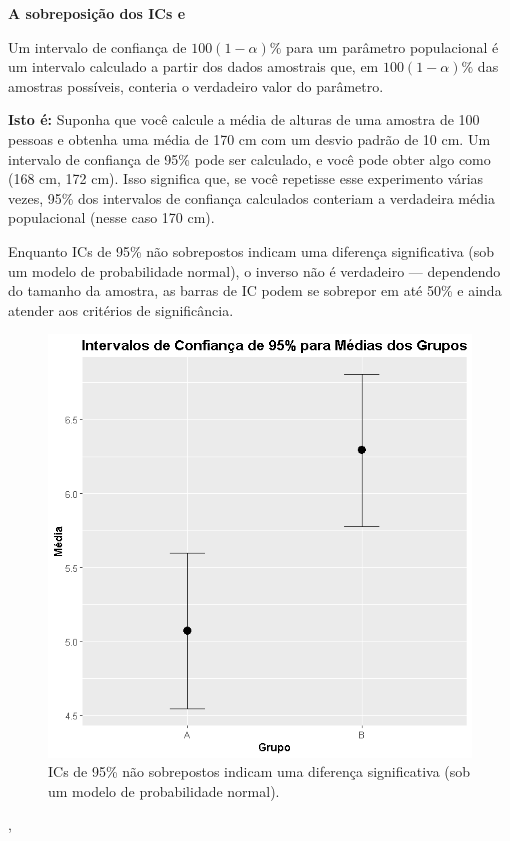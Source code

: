 \documentclass[article]{memoir}
\begin{document}
\begin{tcolorbox}
	\textbf{A sobreposição dos ICs  \cite{cumming2007} e \cite{krzywinski2013}}
	
	Um intervalo de confiança de $100(1 − \alpha)\%$  para um parâmetro populacional é um intervalo calculado a partir dos dados amostrais que, em $100(1 − \alpha)\%$ das amostras possíveis, conteria o verdadeiro valor do parâmetro.
	
	\textbf{Isto é:} Suponha que você calcule a média de alturas de uma amostra de 100 pessoas e obtenha uma média de 170 cm com um desvio padrão de 10 cm. Um intervalo de confiança de 95\% pode ser calculado, e você pode obter algo como (168 cm, 172 cm). Isso significa que, se você repetisse esse experimento várias vezes, 95\% dos intervalos de confiança calculados conteriam a verdadeira média populacional (nesse caso 170 cm).
	
\end{tcolorbox} 



 Enquanto ICs de 95\% não sobrepostos indicam uma diferença significativa (sob um modelo de probabilidade normal), o inverso não é verdadeiro — dependendo do tamanho da amostra, as barras de IC podem se sobrepor em até 50\% e ainda atender aos critérios de significância.



\begin{figure}[ht]
	\centering
	\includegraphics[width=0.7\linewidth]{figs/IC_sobrep_visual}
	\caption{ICs de 95\% não sobrepostos indicam uma diferença significativa (sob um modelo de probabilidade normal).}
	\label{fig:icsobrepvisual}
\end{figure}






\newpage, 
\thispagestyle{plain}
\printpagenotes


\thispagestyle{plain}
\end{document}
